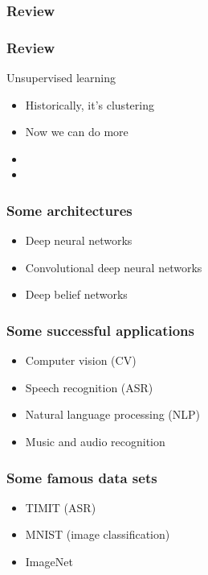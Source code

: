 \begin{frame}
  \frametitle{Review}
\end{frame}

\begin{frame}
  \frametitle{Review}
  Unsupervised learning
  \begin{itemize}
  \item<1-> Historically, it's clustering
  \item<1-> Now we can do more
  \item<2-> 
  \item<2->
  \end{itemize}
\end{frame}

\begin{frame}
  \frametitle{Some architectures}
  \begin{itemize}
  \item Deep neural networks
  \item Convolutional deep neural networks
  \item Deep belief networks
  \end{itemize}
\end{frame}

\begin{frame}
  \frametitle{Some successful applications}
  \begin{itemize}
  \item Computer vision (CV)
  \item Speech recognition (ASR)
  \item Natural language processing (NLP)
  \item Music and audio recognition
  \end{itemize}
\end{frame}

\begin{frame}
  \frametitle{Some famous data sets}
  \begin{itemize}
  \item TIMIT (ASR)
  \item MNIST (image classification)
  \item ImageNet
  \end{itemize}
\end{frame}

